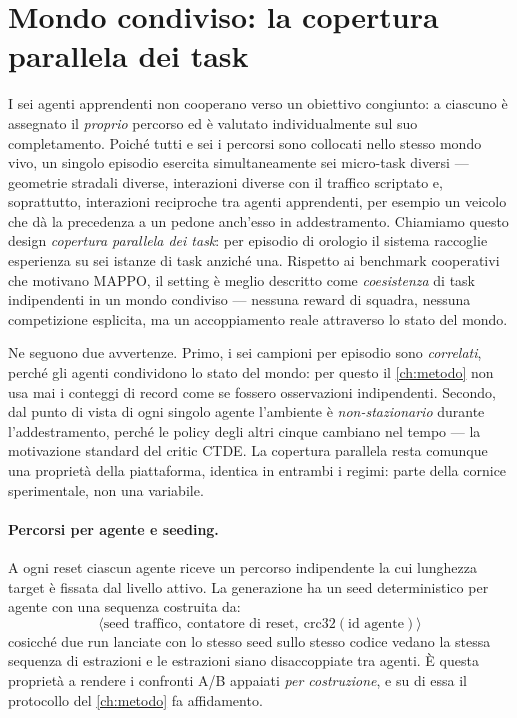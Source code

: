 \section{Mondo condiviso: la copertura parallela dei task}
\label{sec:mondo}

I sei agenti apprendenti non cooperano verso un obiettivo congiunto: a
ciascuno è assegnato il \emph{proprio} percorso ed è valutato
individualmente sul suo completamento. Poiché tutti e sei i percorsi
sono collocati nello stesso mondo vivo, un singolo episodio esercita
simultaneamente sei micro-task diversi --- geometrie stradali diverse,
interazioni diverse con il traffico scriptato e, soprattutto,
interazioni reciproche tra agenti apprendenti, per esempio un veicolo
che dà la precedenza a un pedone anch'esso in addestramento. Chiamiamo
questo design \emph{copertura parallela dei task}: per episodio di
orologio il sistema raccoglie esperienza su sei istanze di task anziché
una. Rispetto ai benchmark cooperativi che motivano MAPPO, il setting è
meglio descritto come \emph{coesistenza} di task indipendenti in un
mondo condiviso --- nessuna reward di squadra, nessuna competizione
esplicita, ma un accoppiamento reale attraverso lo stato del mondo.

Ne seguono due avvertenze. Primo, i sei campioni per episodio sono
\emph{correlati}, perché gli agenti condividono lo stato del mondo: per
questo il \cref{ch:metodo} non usa mai i conteggi di record come se
fossero osservazioni indipendenti. Secondo, dal punto di vista di ogni
singolo agente l'ambiente è \emph{non-stazionario} durante
l'addestramento, perché le policy degli altri cinque cambiano nel tempo
--- la motivazione standard del critic CTDE. La copertura parallela
resta comunque una proprietà della piattaforma, identica in entrambi i
regimi: parte della cornice sperimentale, non una variabile.

\paragraph{Percorsi per agente e seeding.}
A ogni reset ciascun agente riceve un percorso indipendente la cui
lunghezza target è fissata dal livello attivo. La generazione ha un seed
deterministico per agente con una sequenza costruita da:
\[
  \langle\text{seed traffico},\ \text{contatore di reset},\
  \mathrm{crc32}(\text{id agente})\rangle
\]
cosicché due run lanciate con lo stesso seed sullo stesso codice vedano
la stessa sequenza di estrazioni e le estrazioni siano disaccoppiate tra 
agenti. È questa proprietà a rendere i confronti A/B appaiati \emph{per costruzione}, 
e su di essa il protocollo del \cref{ch:metodo} fa affidamento.

